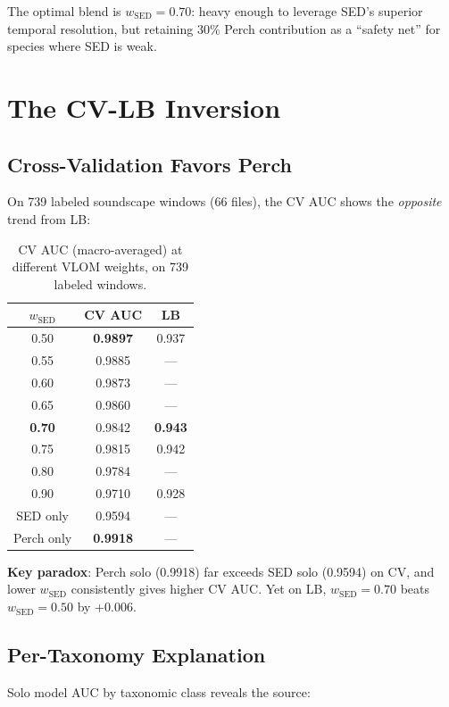 \documentclass[a4paper,11pt]{article}
\begin{document}
The optimal blend is $w_\text{SED}=0.70$: heavy enough to leverage SED's superior temporal resolution,
but retaining 30\% Perch contribution as a ``safety net'' for species where SED is weak.

\section{The CV-LB Inversion}

\subsection{Cross-Validation Favors Perch}

On 739 labeled soundscape windows (66 files), the CV AUC shows the \emph{opposite} trend from LB:

\begin{table}[h]
\centering
\caption{CV AUC (macro-averaged) at different VLOM weights, on 739 labeled windows.}
\begin{tabular}{ccc}
\toprule
$w_\text{SED}$ & CV AUC & LB \\
\midrule
0.50 & \textbf{0.9897} & 0.937 \\
0.55 & 0.9885 & --- \\
0.60 & 0.9873 & --- \\
0.65 & 0.9860 & --- \\
\textbf{0.70} & 0.9842 & \textbf{0.943} \\
0.75 & 0.9815 & 0.942 \\
0.80 & 0.9784 & --- \\
0.90 & 0.9710 & 0.928 \\
\midrule
SED only & 0.9594 & --- \\
Perch only & \textbf{0.9918} & --- \\
\bottomrule
\end{tabular}
\label{tab:cv}
\end{table}

\textbf{Key paradox}: Perch solo (0.9918) far exceeds SED solo (0.9594) on CV,
and lower $w_\text{SED}$ consistently gives higher CV AUC.
Yet on LB, $w_\text{SED}=0.70$ beats $w_\text{SED}=0.50$ by +0.006.

\subsection{Per-Taxonomy Explanation}

Solo model AUC by taxonomic class reveals the source:
\end{document}
